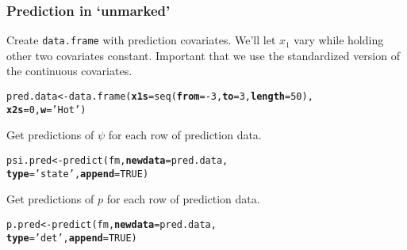 \documentclass[color=usenames,dvipsnames]{beamer}\usepackage[]{graphicx}\usepackage[]{color}
\makeatletter
\newcommand{\hlnum}[1]{\textcolor[rgb]{0.69,0.494,0}{#1}}%
\newcommand{\hlstr}[1]{\textcolor[rgb]{0.749,0.012,0.012}{#1}}%
\newcommand{\hlopt}[1]{\textcolor[rgb]{0,0,0}{#1}}%
\newcommand{\hlstd}[1]{\textcolor[rgb]{0,0,0}{#1}}%
\newcommand{\hlkwb}[1]{\textcolor[rgb]{0,0.341,0.682}{#1}}%
\newcommand{\hlkwc}[1]{\textcolor[rgb]{0,0,0}{\textbf{#1}}}%
\newcommand{\hlkwd}[1]{\textcolor[rgb]{0.004,0.004,0.506}{#1}}%
\newenvironment{kframe}{%
 \def\at@end@of@kframe{}%
 \ifinner\ifhmode%
  \def\at@end@of@kframe{\end{minipage}}%
  \begin{minipage}{\columnwidth}%
 \fi\fi%
 \def\FrameCommand##1{\hskip\@totalleftmargin \hskip-\fboxsep
 \colorbox{shadecolor}{##1}\hskip-\fboxsep
     \hskip-\linewidth \hskip-\@totalleftmargin \hskip\columnwidth}%
 \MakeFramed {\advance\hsize-\width
   \@totalleftmargin\z@ \linewidth\hsize
   \@setminipage}}%
 {\par\unskip\endMakeFramed%
 \at@end@of@kframe}
\newenvironment{knitrout}{}{} %
\makeatother
\begin{document}
\begin{frame}[fragile]
  \frametitle{Prediction in `unmarked'}
  Create \texttt{data.frame} with prediction covariates. We'll let $x_1$
  vary while holding other two covariates constant. Important that we
  use the standardized version of the continuous covariates.
\begin{knitrout}\small
{}\color{fgcolor}\begin{kframe}
\begin{alltt}
\hlstd{pred.data} \hlkwb{<-} \hlkwd{data.frame}\hlstd{(}\hlkwc{x1s}\hlstd{=}\hlkwd{seq}\hlstd{(}\hlkwc{from}\hlstd{=}\hlopt{-}\hlnum{3}\hlstd{,} \hlkwc{to}\hlstd{=}\hlnum{3}\hlstd{,} \hlkwc{length}\hlstd{=}\hlnum{50}\hlstd{),}
                        \hlkwc{x2s}\hlstd{=}\hlnum{0}\hlstd{,} \hlkwc{w}\hlstd{=}\hlstr{'Hot'}\hlstd{)}
\end{alltt}
\end{kframe}
\end{knitrout}
\pause
\vfill
Get predictions of $\psi$ for each row of prediction data.
\begin{knitrout}\small
{}\color{fgcolor}\begin{kframe}
\begin{alltt}
\hlstd{psi.pred} \hlkwb{<-} \hlkwd{predict}\hlstd{(fm,} \hlkwc{newdata}\hlstd{=pred.data,}
                    \hlkwc{type}\hlstd{=}\hlstr{'state'}\hlstd{,} \hlkwc{append}\hlstd{=}\hlnum{TRUE}\hlstd{)}
\end{alltt}
\end{kframe}
\end{knitrout}
\pause
\vfill
Get predictions of $p$ for each row of prediction data.
\begin{knitrout}\small
{}\color{fgcolor}\begin{kframe}
\begin{alltt}
\hlstd{p.pred} \hlkwb{<-} \hlkwd{predict}\hlstd{(fm,} \hlkwc{newdata}\hlstd{=pred.data,}
                  \hlkwc{type}\hlstd{=}\hlstr{'det'}\hlstd{,} \hlkwc{append}\hlstd{=}\hlnum{TRUE}\hlstd{)}
\end{alltt}
\end{kframe}
\end{knitrout}
\end{frame}
\end{document}
